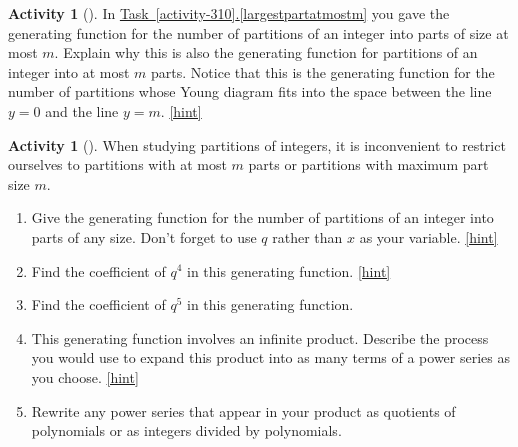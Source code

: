 \documentclass[10pt,]{book}
\theoremstyle{plain}
\theoremstyle{definition}
\theoremstyle{definition}
\theoremstyle{definition}
\newtheorem{activity}[project]{Activity}
\numberwithin{equation}{chapter}
\begin{document}
\begin{activity}[]\label{atmostmparts}
\hypertarget{p-1574}{}%
In \hyperref[largestpartatmostm]{Task~\ref{activity-310}.\ref{largestpartatmostm}} you gave the generating function for the number of partitions of an integer into parts of size at most \(m\). Explain why this is also the generating function for partitions of an integer into at most \(m\) parts. Notice that this is the generating function for the number of partitions whose Young diagram fits into the space between the line \(y=0\) and the line \(y=m\).%
\hfill{\tiny\hyperlink{a-318}{[hint]}\hypertarget{q-318}{}}\end{activity}
\begin{activity}[]\label{genfunpartitions}
\hypertarget{p-1577}{}%
When studying partitions of integers, it is inconvenient to restrict ourselves to partitions with at most \(m\) parts or partitions with maximum part size \(m\).%
\begin{enumerate}[font=\bfseries,label=(\alph*),ref=\alph*]
\item\label{task-271} \hypertarget{p-1578}{}%
Give the generating function for the number of partitions of an integer into parts of any size. Don't forget to use \(q\) rather than \(x\) as your variable.%
\hfill{\tiny\hyperlink{a-319.a}{[hint]}\hypertarget{q-319.a}{}}\item\label{task-272} \hypertarget{p-1581}{}%
Find the coefficient of \(q^4\) in this generating function.%
\hfill{\tiny\hyperlink{a-319.b}{[hint]}\hypertarget{q-319.b}{}}\item\label{task-273} \hypertarget{p-1584}{}%
Find the coefficient of \(q^5\) in this generating function.%
\item\label{task-274} \hypertarget{p-1586}{}%
This generating function involves an infinite product. Describe the process you would use to expand this product into as many terms of a power series as you choose.%
\hfill{\tiny\hyperlink{a-319.d}{[hint]}\hypertarget{q-319.d}{}}\item\label{task-275} \hypertarget{p-1589}{}%
Rewrite any power series that appear in your product as quotients of polynomials or as integers divided by polynomials.%
\end{enumerate}
\end{activity}
\end{document}
